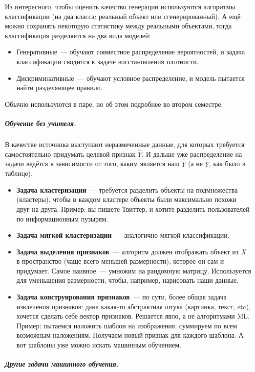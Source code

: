 \documentclass{article}
\begin{document}
    Из интересного, чтобы оценить качество генерации используются алгоритмы классификации (на два класса: реальный объект или сгенерированный). А ещё можно сохранять некоторую статистику между реальными объектами, тогда классификация разделяется на два вида моделей:
    \begin{itemize}
        \item Генеративные~--- обучают совместное распределение вероятностей, и задача классификации сводится к задаче восстановления плотности.
        \item Дискриминативные~--- обучают условное распределение, и модель пытается найти разделяющее правило.
    \end{itemize}
    Обычно используются в паре, но об этом подробнее во втором семестре.
    \subparagraph{Обучение без учителя.}
    В качестве источника выступают неразмеченные данные, для которых требуется самостоятельно придумать целевой признак $\widehat Y$. И дальше уже распределение на задачи ведётся в зависимости от того, каким является наш $\widehat Y$ (а не $Y$, как было в таблице).
    \begin{itemize}
        \item \textbf{Задача кластеризации}~--- требуется разделить объекты на подмножества (кластеры), чтобы в каждом кластере объекты были максимально похожи друг на друга. Пример: вы пишете Твиттер, и хотите разделить пользователей по информационным пузырям.
        \item \textbf{Задача мягкой кластеризации}~--- аналогично мягкой классификации.
        \item \textbf{Задача выделения признаков}~--- алгоритм должен отображать объект из $X$ в пространство (чаще всего меньшей размерности), которое он сам и придумает. Самое наивное~--- умножим на рандомную матрицу. Используется для уменьшения размерности, чтобы, например, нарисовать наши данные.
        \item \textbf{Задача конструирования признаков}~--- по сути, более общая задача извлечения признаков: дана какая-то абстрактная штука (картинка, текст, etc), хочется сделать себе вектор признаков. Решается явно, а не алгоритмами ML. Пример: пытаемся наложить шаблон на изображения, суммируем по всем возможным наложениям. Получаем новый признак для каждого шаблона. А вот шаблоны уже можно искать машинным обучением.
    \end{itemize}
    \subparagraph{Другие задачи машинного обучения.}
\end{document}
